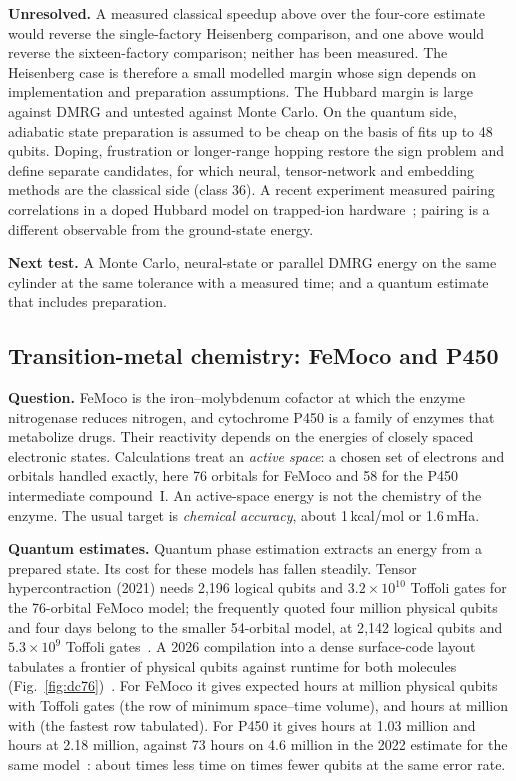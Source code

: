 \textbf{Unresolved.} A measured classical speedup above \thrHeis{} over the four-core estimate would reverse the single-factory Heisenberg comparison, and one above \thrHeisPar{} would reverse the sixteen-factory comparison; neither has been measured. The Heisenberg case is therefore a small modelled margin whose sign depends on implementation and preparation assumptions. The Hubbard margin is large against DMRG and untested against Monte Carlo. On the quantum side, adiabatic state preparation is assumed to be cheap on the basis of fits up to 48 qubits. Doping, frustration or longer-range hopping restore the sign problem and define separate candidates, for which neural, tensor-network and embedding methods are the classical side (class 36). A recent experiment measured pairing correlations in a doped Hubbard model on trapped-ion hardware~\cite{granet2025}; pairing is a different observable from the ground-state energy.

\textbf{Next test.} A Monte Carlo, neural-state or parallel DMRG energy on the same cylinder at the same tolerance with a measured time; and a quantum estimate that includes preparation.

\subsection{Transition-metal chemistry: FeMoco and P450}
\label{sec:chem}

\textbf{Question.} FeMoco is the iron--molybdenum cofactor at which the enzyme nitrogenase reduces nitrogen, and cytochrome P450 is a family of enzymes that metabolize drugs. Their reactivity depends on the energies of closely spaced electronic states. Calculations treat an \emph{active space}: a chosen set of electrons and orbitals handled exactly, here 76 orbitals for FeMoco and 58 for the P450 intermediate compound~I. An active-space energy is not the chemistry of the enzyme. The usual target is \emph{chemical accuracy}, about 1\,kcal/mol or 1.6\,mHa.

\textbf{Quantum estimates.} Quantum phase estimation extracts an energy from a prepared state. Its cost for these models has fallen steadily. Tensor hypercontraction (2021) needs 2{,}196 logical qubits and $3.2\times10^{10}$ Toffoli gates for the 76-orbital FeMoco model; the frequently quoted four million physical qubits and four days belong to the smaller 54-orbital model, at 2{,}142 logical qubits and $5.3\times10^9$ Toffoli gates~\cite{lee2021thc}. A 2026 compilation into a dense surface-code layout tabulates a frontier of physical qubits against runtime for both molecules (Fig.~\ref{fig:dc76})~\cite{low2026dense}. For FeMoco it gives \femoT{} expected hours at \femoSevMinvolQ{} million physical qubits with \femoTofMinvol{} Toffoli gates (the row of minimum space--time volume), and \femoFastT{} hours at \femoSevFastQ{} million with \femoTofFast{} (the fastest row tabulated). For P450 it gives \pfMinvolH{} hours at 1.03 million and \pfFastH{} hours at 2.18 million, against 73 hours on 4.6 million in the 2022 estimate for the same model~\cite{goings2022}: about \pfSpeed{} times less time on \pfQubits{} times fewer qubits at the same error rate.

